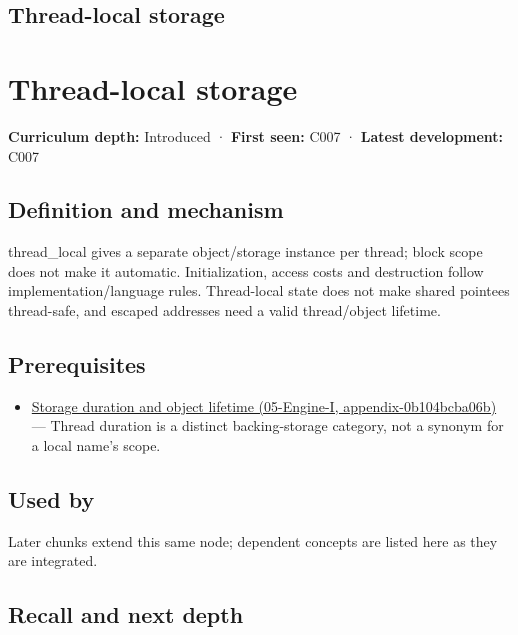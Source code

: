 \hypertarget{appendix-3b88c6cd7195}{}
\section*{Thread-local storage}
\chapter{Thread-local storage}\label{appendix-3b88c6cd7195-thread-local-storage}

\textbf{Curriculum depth:} Introduced · \textbf{First seen:} C007 · \textbf{Latest development:} C007

\section{Definition and mechanism}\label{appendix-3b88c6cd7195-definition-and-mechanism}

thread\_local gives a separate object/storage instance per thread; block scope does not make it automatic. Initialization, access costs and destruction follow implementation/language rules. Thread-local state does not make shared pointees thread-safe, and escaped addresses need a valid thread/object lifetime.

\section{Prerequisites}\label{appendix-3b88c6cd7195-prerequisites}

\begin{itemize}
\tightlist
\item
  \href{../05-Engine-I/main.pdf\#nameddest=appendix-0b104bcba06b}{Storage duration and object lifetime (05-Engine-I, appendix-0b104bcba06b)} --- Thread duration is a distinct backing-storage category, not a synonym for a local name's scope.
\end{itemize}

\section{Used by}\label{appendix-3b88c6cd7195-used-by}

Later chunks extend this same node; dependent concepts are listed here as they are integrated.

\section{Recall and next depth}\label{appendix-3b88c6cd7195-recall-and-next-depth}


